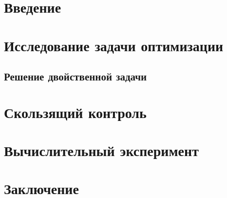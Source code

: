 \documentclass[12pt]{article}
\begin{document}
	
	\newpage \tableofcontents
	\newpage 
	\newpage 

	\section{Введение} 
		
		
	\section{Исследование задачи оптимизации}
		\subsection{Решение двойственной задачи}	
	\section{Скользящий контроль}
		
	\section{Вычислительный эксперимент}
		
	\section{Заключение}
		
	\newpage 
	
\end{document}
